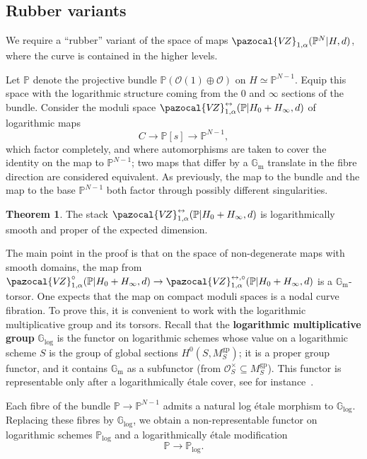 \documentclass[11pt]{amsart}
\newcommand{\VZ}{\pazocal{V\!Z}}
\newcommand{\OO}{\mathcal{O}}
\renewcommand{\to}{\rightarrow}
\newcommand{\Gm}{\mathbb{G}_{\text{m}}}
\theoremstyle{definition}
\newtheorem{thm}{Theorem}[section]
\theoremstyle{definition}
\begin{document}
\subsection{Rubber variants}\label{subsection rubber} We require a ``rubber'' variant of the space of maps $\VZ_{1,\alpha}(\mathbb P^N|H,d)$, where the curve is contained in the higher levels.

Let $\mathbb P$ denote the projective bundle $\mathbb P(\mathcal O(1)\oplus\mathcal O)$ on $H\simeq\mathbb P^{N-1}$. Equip this space with the logarithmic structure coming from the $0$ and $\infty$ sections of the bundle. Consider the moduli space $\VZ^{\leftrightarrow}_{1,\alpha}(\mathbb P|H_0+H_\infty,d)$ of logarithmic maps
\[
C\to \mathbb P[s]\to \mathbb P^{N-1},
\]
which factor completely, and where automorphisms are taken to cover the identity on the map to $\mathbb P^{N-1}$; two maps that differ by a $\mathbb G_{\operatorname{m}}$ translate in the fibre direction are considered equivalent. As previously, the map to the bundle and the map to the base $\mathbb P^{N-1}$ both factor through possibly different singularities. 

\begin{thm}\label{thm rubber log smooth}
The stack $\VZ^{\leftrightarrow}_{1,\alpha}(\mathbb P|H_0+H_\infty,d)$ is logarithmically smooth and proper of the expected dimension.
\end{thm}

The main point in the proof is that on the space of non-degenerate maps with smooth domains, the map from $\VZ^\circ_{1,\alpha}(\mathbb P|H_0+H_\infty,d)\to \VZ^{\leftrightarrow,\circ}_{1,\alpha}(\mathbb P|H_0+H_\infty,d)$ is a $\mathbb G_{\operatorname{m}}$-torsor. One expects that the map on compact moduli spaces is a nodal curve fibration. To prove this, it is convenient to work with the logarithmic multiplicative group and its torsors. Recall that the \textbf{logarithmic multiplicative group} $\mathbb G_{\mathrm{log}}$ is the functor on logarithmic schemes whose value on a logarithmic scheme $S$ is the group of global sections $H^0(S,M_S^{\mathrm{gp}})$; it is a proper group functor, and it contains $\Gm$ as a subfunctor (from $\OO^\times_S\subseteq M_S^{\mathrm{gp}}$). This functor is representable only after a logarithmically \'etale cover, see for instance~\cite{MW17,RW19}.

Each fibre of the bundle $\mathbb P \to \mathbb P^{N-1}$ admits a natural log \'etale morphism to $\mathbb G_{\mathrm{log}}$. Replacing these fibres by $\mathbb G_{\mathrm{log}}$, we obtain a non-representable functor on logarithmic schemes $\mathbb P_{\mathrm{log}}$ and a logarithmically \'etale modification
\[
\mathbb P\to \mathbb P_{\mathrm{log}}.
\]
\end{document}
